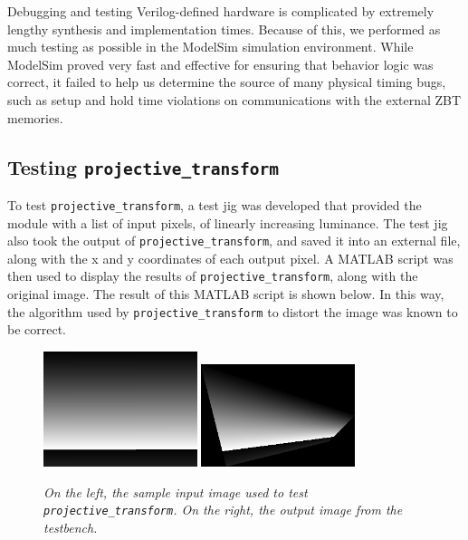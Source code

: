 \documentclass[10pt]{article}
\begin{document}
Debugging and testing Verilog-defined hardware is complicated by extremely lengthy synthesis and implementation times. Because of this, we performed as much testing as possible in the ModelSim simulation environment. While ModelSim proved very fast and effective for ensuring that behavior logic was correct, it failed to help us determine the source of many physical timing bugs, such as setup and hold time violations on communications with the external ZBT memories.

\subsection{Testing {\tt projective\_transform}}

To test {\tt projective\_transform}, a test jig was developed that provided the module with a list of input pixels, of linearly increasing luminance. The test jig also took the output of {\tt projective\_transform}, and saved it into an external file, along with the x and y coordinates of each output pixel. A MATLAB script was then used to display the results of {\tt projective\_transform}, along with the original image. The result of this MATLAB script is shown below. In this way, the algorithm used by {\tt projective\_transform} to distort the image was known to be correct.

\begin{figure}[h!]
\centering
\includegraphics[width=0.4\textwidth]{images/original.png}
\includegraphics[width=0.4\textwidth]{images/output.png}
\caption{\emph{On the left, the sample input image used to test {\tt projective\_transform}. On the right, the output image from the testbench.}}
\end{figure}
\end{document}

